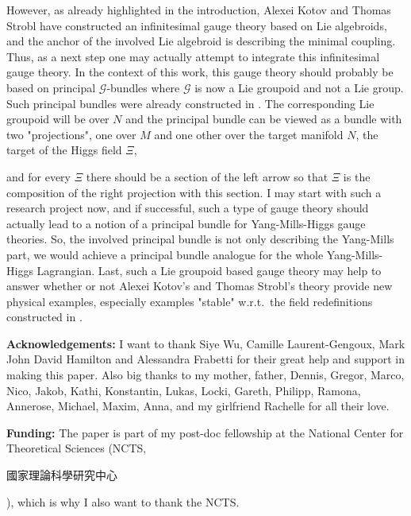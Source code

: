 \documentclass[a4paper,oneside,11pt,bibliography=totoc]{scrartcl}
\theoremstyle{plain}
\theoremstyle{remark}
\theoremstyle{definition}
\begin{document}
However, as already highlighted in the introduction, Alexei Kotov and Thomas Strobl have constructed an infinitesimal gauge theory based on Lie algebroids, and the anchor of the involved Lie algebroid is describing the minimal coupling. Thus, as a next step one may actually attempt to integrate this infinitesimal gauge theory. In the context of this work, this gauge theory should probably be based on principal $\mathcal{G}$-bundles where $\mathcal{G}$ is now a Lie groupoid and not a Lie group. Such principal bundles were already constructed in \cite[beginning of \S 5.7, page 144f.]{GroupoidBasedPrincipalBundles}. The corresponding Lie groupoid will be over $N$ and the principal bundle can be viewed as a bundle with two "projections", one over $M$ and one other over the target manifold $N$, the target of the Higgs field $\Xi$,

\begin{center}
\end{center}

and for every $\Xi$ there should be a section of the left arrow so that $\Xi$ is the composition of the right projection with this section.
I may start with such a research project now, and if successful, such a type of gauge theory should actually lead to a notion of a principal bundle for Yang-Mills-Higgs gauge theories. So, the involved principal bundle is not only describing the Yang-Mills part, we would achieve a principal bundle analogue for the whole Yang-Mills-Higgs Lagrangian. Last, such a Lie groupoid based gauge theory may help to answer whether or not Alexei Kotov's and Thomas Strobl's theory provide new physical examples, especially examples "stable" w.r.t.\ the field redefinitions constructed in \cite{MyThesis}.

\textbf{Acknowledgements:} I want to thank Siye Wu, Camille Laurent-Gengoux, Mark John David Hamilton and Alessandra Frabetti for their great help and support in making this paper. Also big thanks to my mother, father, Dennis, Gregor, Marco, Nico, Jakob, Kathi, Konstantin, Lukas, Locki, Gareth, Philipp, Ramona, Annerose, Michael, Maxim, Anna, and my girlfriend Rachelle for all their love.

\textbf{Funding:} The paper is part of my post-doc fellowship at the National Center for Theoretical Sciences (NCTS, \begin{CJK*}{UTF8}{bkai}國家理論科學研究中心\end{CJK*}), which is why I also want to thank the NCTS.
\end{document}
